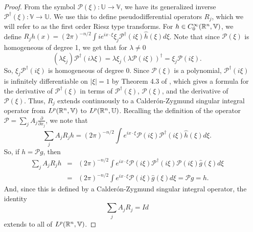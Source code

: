 \documentclass{amsart}
\theoremstyle{definition}
\numberwithin{equation}{section}
\begin{document}
\begin{proof}
From the symbol ${\mathcal{P}}(\xi): {\mathbb{U}} \to {\mathbb{V}}$, we have its generalized inverse ${\mathcal{P}}^\dagger (\xi): {\mathbb{V}} \to {\mathbb{U}}$.  We use this to define pseudodifferential operators $R_j$, which we will refer to as the first order Riesz type transforms.  For $h \in C_0^\infty(\Bbb R^n, {\mathbb{V}})$, we define $R_j h (x) = (2\pi)^{-n/2} \int i e^{ix\cdot \xi} \xi_j{\mathcal{P}}^\dagger (i\xi) \widehat{h}(\xi) d\xi$. Note that since ${\mathcal{P}}(\xi)$ is homogeneous of degree 1, we get that for ${\lambda}\neq 0$ $$({\lambda}\xi_j){\mathcal{P}}^\dagger(i{\lambda}\xi) = {\lambda}\xi_j \left( {\lambda} {\mathcal{P}}(i\xi)\right)^\dagger = \xi_j{\mathcal{P}}(i\xi).$$  So, $\xi_j{\mathcal{P}}^\dagger(i\xi)$ is homogeneous of degree 0.  Since ${\mathcal{P}}(\xi)$ is a polynomial, ${\mathcal{P}}^\dagger(i\xi)$ is infinitely differentiable on ${\left\vert{\xi}\right\vert}=1$ by Theorem 4.3 of \cite{Golub_Pereyra73}, which gives a formula for the derivative of ${\mathcal{P}}^\dagger(\xi)$ in terms of ${\mathcal{P}}^\dagger(\xi)$, ${\mathcal{P}}(\xi)$, and the derivative of ${\mathcal{P}}(\xi)$.  Thus, $R_j$ extends continuously to a Calder\'on-Zygmund singular integral operator from $L^p(\Bbb R^n, {\mathbb{V}})$ to $L^p(\Bbb R^n, {\mathbb{U}})$.  Recalling the definition of the operator ${\mathcal{P}} = \sum_j A_j \frac {\partial} {\partial x_j}$, we note that $$\sum_j A_j R_j h = (2\pi)^{-n/2} \int e^{ix\cdot \xi} {\mathcal{P}}(i \xi) {\mathcal{P}}^\dagger(i\xi) \widehat{h} (\xi) d\xi.$$  So, if $h={\mathcal{P}} g$, then \begin{eqnarray*}\sum_j A_j R_j h &=& (2\pi)^{-n/2} \int e^{ix\cdot \xi} {\mathcal{P}}(i \xi) {\mathcal{P}}^\dagger(i\xi) {\mathcal{P}}(i \xi) \widehat{g} (\xi) d\xi \\ &=& (2\pi)^{-n/2} \int e^{ix\cdot \xi} {\mathcal{P}}(i \xi) \widehat{g} (\xi) d\xi = {\mathcal{P}} g = h.\end{eqnarray*} And, since this is defined by a Calder\'{o}n-Zygmund singular integral operator, the identity $$\sum_j A_j R_j = Id$$ extends to all of $L^p(\Bbb R^n, {\mathbb{V}})$.


\end{proof}
\end{document}

